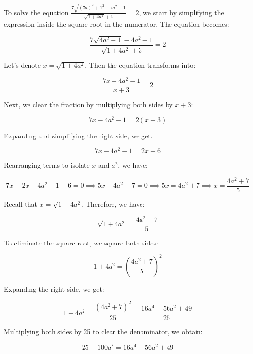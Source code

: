\begin{figure*}[htbp]
    \centering
\begin{tcolorbox}[title=Large Teacher CoT Example (1/2), promptstyle]
\lstset{
    basicstyle=\normalfont\sffamily\footnotesize,
    breaklines=true,
    frame=none,
    columns=fullflexible,
}

To solve the equation \(\frac{7\sqrt{(2a)^2 + 1^2} - 4a^2 - 1}{\sqrt{1 + 4a^2} + 3} = 2\), we start by simplifying the expression inside the square root in the numerator. The equation becomes:

\[
\frac{7\sqrt{4a^2 + 1} - 4a^2 - 1}{\sqrt{1 + 4a^2} + 3} = 2
\]

Let's denote \(x = \sqrt{1 + 4a^2}\). Then the equation transforms into:

\[
\frac{7x - 4a^2 - 1}{x + 3} = 2
\]

Next, we clear the fraction by multiplying both sides by \(x + 3\):

\[
7x - 4a^2 - 1 = 2(x + 3)
\]

Expanding and simplifying the right side, we get:

\[
7x - 4a^2 - 1 = 2x + 6
\]

Rearranging terms to isolate \(x\) and \(a^2\), we have:

\[
7x - 2x - 4a^2 - 1 - 6 = 0 \implies 5x - 4a^2 - 7 = 0 \implies 5x = 4a^2 + 7 \implies x = \frac{4a^2 + 7}{5}
\]

Recall that \(x = \sqrt{1 + 4a^2}\). Therefore, we have:

\[
\sqrt{1 + 4a^2} = \frac{4a^2 + 7}{5}
\]

To eliminate the square root, we square both sides:

\[
1 + 4a^2 = \left(\frac{4a^2 + 7}{5}\right)^2
\]

Expanding the right side, we get:

\[
1 + 4a^2 = \frac{(4a^2 + 7)^2}{25} = \frac{16a^4 + 56a^2 + 49}{25}
\]

Multiplying both sides by 25 to clear the denominator, we obtain:

\[
25 + 100a^2 = 16a^4 + 56a^2 + 49
\]

\end{tcolorbox}
\end{figure*}



